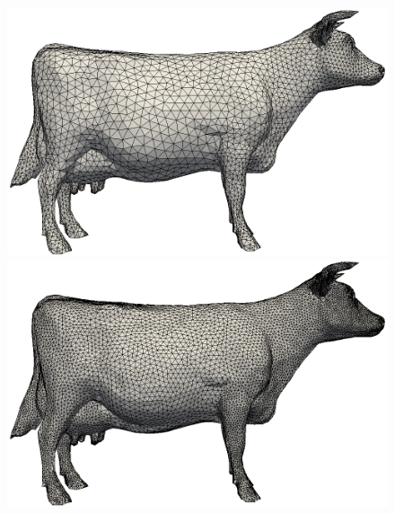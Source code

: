 \documentclass[letter,11pt]{article}
\begin{document}
\begin{figure}
\begin{minipage}{0.30\textwidth}
    \centering
    \includegraphics[width=1\linewidth]{../image/cow_b.png}
  \end{minipage}
  \begin{minipage}{.30\textwidth}
    \centering
    \includegraphics[width=1\linewidth]{../image/cow_c.png}
  \end{minipage} 
  \begin{minipage}{.30\textwidth}
    \centering

\end{minipage}
\end{figure}
\end{document}
